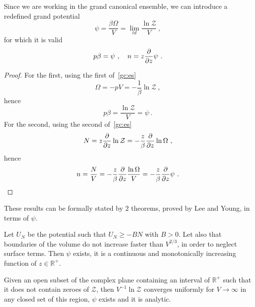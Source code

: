     Since we are working in the grand canonical ensemble, we can introduce a redefined grand potential
    \begin{equation*}
        \psi = \frac{\beta \Omega}{V} = \lim_{td} \frac{\ln \mathcal Z}{V} ~,
    \end{equation*}
    for which it is valid 
    \begin{equation*}
        p \beta = \psi ~, \quad n = z \frac{\partial}{\partial z} \psi ~.
    \end{equation*}
    \begin{proof}
        For the first, using the first of~\eqref{gc:es}
        \begin{equation*}
            \Omega = - p V = - \frac{1}{\beta} \ln \mathcal Z ~,
        \end{equation*}
        hence
        \begin{equation*}
            p \beta = \frac{\ln \mathcal Z}{V} = \psi ~.
        \end{equation*}
        For the second, using the second of~\eqref{gc:es}
        \begin{equation*}
            N = z \frac{\partial}{\partial z} \ln \mathcal Z = - \frac{z}{\beta} \frac{\partial}{\partial z} \ln \Omega ~,
        \end{equation*}
        hence
        \begin{equation*}
            n = \frac{N}{V} = - \frac{z}{\beta} \frac{\partial}{\partial z} \frac{\ln \Omega}{V} =  - \frac{z}{\beta} \frac{\partial}{\partial z} \psi ~.
        \end{equation*}
    \end{proof}
    These results can be formally stated by $2$ theorems, proved by Lee and Young, in terms of $\psi$.
    \begin{theorem}
        Let $U_N$ be the potential such that $U_N \geq - BN$ with $B > 0$. Let also that boundaries of the volume do not increase faster than $V^{2/3}$, in order to neglect surface terms. Then $\psi$ exists, it is a continuous and monotonically increasing function of $z \in \mathbb R^+$.
    \end{theorem}
    \begin{theorem}
        Given an open subset of the complex plane containing an interval of $\mathbb R^+$ such that it does not contain zeroes of $\mathcal Z$, then $V^{-1} \ln \mathcal Z$ converges uniformly for $V \rightarrow \infty$ in any closed set of this region, $\psi$ exists and it is analytic.
    \end{theorem}
